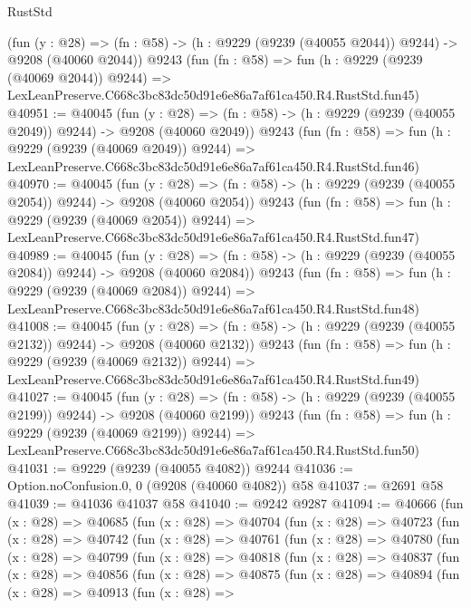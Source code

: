 \begin{lexlean}{RustStd}
\begin{coremodule}
    (fun (y : @28) =>
    (fn : @58) -> (h : @9229 (@9239 (@40055 @2044)) @9244) -> @9208 (@40060 @2044))
    @9243
    (fun (fn : @58) =>
    fun (h : @9229 (@9239 (@40069 @2044)) @9244) =>
    LexLeanPreserve.C668c3bc83dc50d91e6e86a7af61ca450.R4.RustStd.fun45)
@40951 := @40045
    (fun (y : @28) =>
    (fn : @58) -> (h : @9229 (@9239 (@40055 @2049)) @9244) -> @9208 (@40060 @2049))
    @9243
    (fun (fn : @58) =>
    fun (h : @9229 (@9239 (@40069 @2049)) @9244) =>
    LexLeanPreserve.C668c3bc83dc50d91e6e86a7af61ca450.R4.RustStd.fun46)
@40970 := @40045
    (fun (y : @28) =>
    (fn : @58) -> (h : @9229 (@9239 (@40055 @2054)) @9244) -> @9208 (@40060 @2054))
    @9243
    (fun (fn : @58) =>
    fun (h : @9229 (@9239 (@40069 @2054)) @9244) =>
    LexLeanPreserve.C668c3bc83dc50d91e6e86a7af61ca450.R4.RustStd.fun47)
@40989 := @40045
    (fun (y : @28) =>
    (fn : @58) -> (h : @9229 (@9239 (@40055 @2084)) @9244) -> @9208 (@40060 @2084))
    @9243
    (fun (fn : @58) =>
    fun (h : @9229 (@9239 (@40069 @2084)) @9244) =>
    LexLeanPreserve.C668c3bc83dc50d91e6e86a7af61ca450.R4.RustStd.fun48)
@41008 := @40045
    (fun (y : @28) =>
    (fn : @58) -> (h : @9229 (@9239 (@40055 @2132)) @9244) -> @9208 (@40060 @2132))
    @9243
    (fun (fn : @58) =>
    fun (h : @9229 (@9239 (@40069 @2132)) @9244) =>
    LexLeanPreserve.C668c3bc83dc50d91e6e86a7af61ca450.R4.RustStd.fun49)
@41027 := @40045
    (fun (y : @28) =>
    (fn : @58) -> (h : @9229 (@9239 (@40055 @2199)) @9244) -> @9208 (@40060 @2199))
    @9243
    (fun (fn : @58) =>
    fun (h : @9229 (@9239 (@40069 @2199)) @9244) =>
    LexLeanPreserve.C668c3bc83dc50d91e6e86a7af61ca450.R4.RustStd.fun50)
@41031 := @9229 (@9239 (@40055 @4082)) @9244
@41036 := Option.noConfusion.{0, 0} (@9208 (@40060 @4082)) @58
@41037 := @2691 @58
@41039 := @41036 @41037 @58
@41040 := @9242 @9287
@41094 := @40666
    (fun (x : @28) =>
    @40685
      (fun (x : @28) =>
      @40704
        (fun (x : @28) =>
        @40723
          (fun (x : @28) =>
          @40742
            (fun (x : @28) =>
            @40761
              (fun (x : @28) =>
              @40780
                (fun (x : @28) =>
                @40799
                  (fun (x : @28) =>
                  @40818
                    (fun (x : @28) =>
                    @40837
                      (fun (x : @28) =>
                      @40856
                        (fun (x : @28) =>
                        @40875
                          (fun (x : @28) =>
                          @40894
                            (fun (x : @28) =>
                            @40913
                              (fun (x : @28) =>

\end{coremodule}
\end{lexlean}
